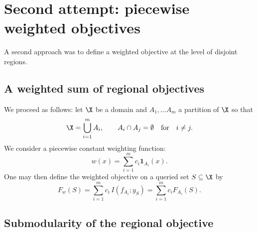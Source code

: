 \section{Second attempt: piecewise weighted objectives} 

A second approach was to define a weighted objective at the level of disjoint regions. 

\subsection{A weighted sum of regional objectives}

We proceed as follows: let $\X$ be a domain and $A_1, \ldots A_m$ a partition of $\X$ so that
\begin{equation*}
\X=\bigcup_{i=1}^m A_i,
\qquad
A_i \cap A_j = \emptyset \quad \text{for} \quad i \neq j.
\end{equation*}
We consider a piecewise constant weighting function:
\begin{equation*}
w(x)=\sum_{i=1}^m c_i\mathbf{1}_{A_i}(x).
\end{equation*}
One may then define the weighted objective on a queried set $S \subseteq \X$ by
\begin{equation*}
F_w(S)
=
\sum_{i=1}^m
c_i\,I(f_{A_i};y_S) = \sum_{i=1}^m
c_i F_{A_i}(S).
\end{equation*}

\subsection{Submodularity of the regional objective}


